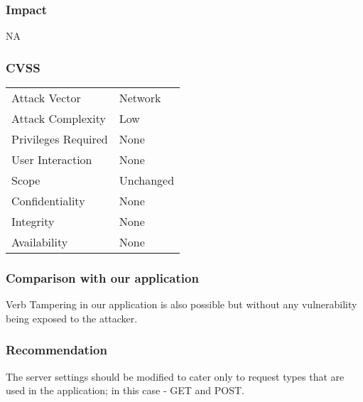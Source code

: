 \subsubsection{Impact}
NA

\subsubsection{CVSS}
\begin{tabular}{l | l}
Attack Vector		& Network \\
Attack Complexity	& Low \\
Privileges Required & None \\
User Interaction	& None \\
Scope				& Unchanged \\
Confidentiality		& None \\
Integrity			& None \\
Availability		& None
\end{tabular}

\subsubsection{Comparison with our application}
Verb Tampering in our application is also possible but without any vulnerability being exposed to the attacker.

\subsubsection{Recommendation}
The server settings should be modified to cater only to request types that are used in the application; in this case - GET and POST.
\clearpage